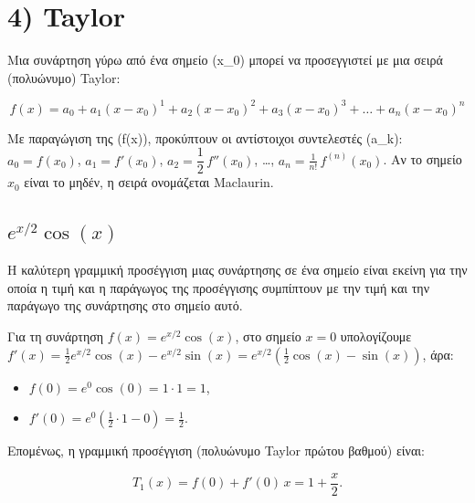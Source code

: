 \documentclass[
  a4paper,
  11pt,
]{article}
\begin{document}
\section{4) Taylor}\label{taylor}

Μια συνάρτηση γύρω από ένα σημείο (x\_0) μπορεί να προσεγγιστεί με μια
σειρά (πολυώνυμο) Taylor:

\[
f(x) = a_0 + a_1(x - x_0)^1 + a_2(x - x_0)^2 + a_3(x - x_0)^3 + \dots + a_n(x - x_0)^n
\]

Με παραγώγιση της (f(x)), προκύπτουν οι αντίστοιχοι συντελεστές (a\_k):
\(a_0 = f(x_0)\), \(a_1 = f'(x_0)\), \(a_2 = \dfrac{1}{2}\,f''(x_0)\),
\ldots, \(a_n = \frac{1}{n!}\,f^{(n)}(x_0)\). Αν το σημείο \(x_0\) είναι
το μηδέν, η σειρά ονομάζεται Maclaurin.

\subsection{\texorpdfstring{\(e^{x/2}\cos(x)\)}{e\^{}\{x/2\}\textbackslash cos(x)}}\label{ex2cosx}

Η καλύτερη γραμμική προσέγγιση μιας συνάρτησης σε ένα σημείο είναι
εκείνη για την οποία η τιμή και η παράγωγος της προσέγγισης συμπίπτουν
με την τιμή και την παράγωγο της συνάρτησης στο σημείο αυτό.

Για τη συνάρτηση \(f(x) = e^{x/2} \cos(x)\), στο σημείο \(x = 0\)
υπολογίζουμε
\(f'(x) = \frac{1}{2} e^{x/2} \cos(x) - e^{x/2} \sin(x) = e^{x/2} \left( \frac{1}{2} \cos(x) - \sin(x) \right)\),
άρα:

\begin{itemize}
\item
  \(f(0) = e^{0} \cos(0) = 1 \cdot 1 = 1\),
\item
  \(f'(0) = e^{0} \left( \frac{1}{2} \cdot 1 - 0 \right) = \frac{1}{2}\).
\end{itemize}

Επομένως, η γραμμική προσέγγιση (πολυώνυμο Taylor πρώτου βαθμού) είναι:

\[
\boxed{T_1(x) = f(0) + f'(0) \, x = 1 + \frac{x}{2}}.
\]
\end{document}
